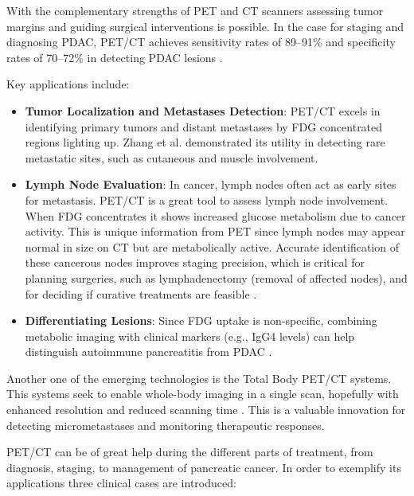 \documentclass[11pt]{article} %
\begin{document}
With the complementary strengths of PET and CT scanners assessing tumor margins and guiding surgical interventions is possible. In the case for staging and diagnosing PDAC, PET/CT achieves sensitivity rates of 89–91\% and specificity rates of 70–72\% in detecting PDAC lesions \cite{TG174}.

Key applications include:
\begin{itemize}
    \item \textbf{Tumor Localization and Metastases Detection}: PET/CT excels in identifying primary tumors and distant metastases by FDG concentrated regions lighting up. Zhang et al. demonstrated its utility in detecting rare metastatic sites, such as cutaneous and muscle involvement\cite{Zhang2023}.
    \item \textbf{Lymph Node Evaluation}: In cancer, lymph nodes often act as early sites for metastasis. PET/CT is a great tool to assess lymph node involvement. When FDG concentrates it shows increased glucose metabolism due to cancer activity. This is unique information from PET since lymph nodes may appear normal in size on CT but are metabolically active. Accurate identification of these cancerous nodes improves staging precision, which is critical for planning surgeries, such as lymphadenectomy (removal of affected nodes), and for deciding if curative treatments are feasible \cite{TG174}.
    \item \textbf{Differentiating Lesions}: Since FDG uptake is non-specific, combining metabolic imaging with clinical markers (e.g., IgG4 levels) can help distinguish autoimmune pancreatitis from PDAC \cite{Zheng2018}.
\end{itemize}

Another one of the emerging technologies is the Total Body PET/CT systems. This systems seek to enable whole-body imaging in a single scan, hopefully with enhanced resolution and reduced scanning time \cite{SunderlandSeminar}. This is a valuable innovation for detecting micrometastases and monitoring therapeutic responses. %


PET/CT can be of great help during the different parts of treatment, from diagnosis, staging, to management of pancreatic cancer. In order to exemplify its applications three clinical cases are introduced:
\end{document}
